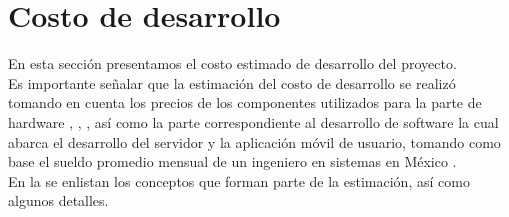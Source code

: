 \section{Costo de desarrollo}
En esta sección presentamos el costo estimado de desarrollo del proyecto. \\
Es importante señalar que la estimación del costo de desarrollo se realizó tomando en cuenta los precios de los componentes utilizados para la parte de hardware \citep{MarcoTeorico5}, \citep{PlacaMCP}, \citep{PrecioDSPIC}, \citep{PrecioRasp} así como la parte correspondiente al desarrollo de software la cual abarca el desarrollo del servidor y la aplicación móvil de usuario, tomando como base el sueldo promedio mensual de un ingeniero en sistemas en México \citep{SalarioPromedio}.\\

En la %
se enlistan los conceptos que forman parte de la estimación, así como algunos detalles.




